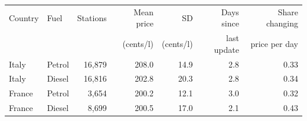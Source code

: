 \begin{tabular}{llrrrrr}
\toprule
Country & Fuel & Stations & Mean price & SD & Days since & Share changing \\
 & & & (cents/l) & (cents/l) & last update & price per day \\
\midrule
Italy & Petrol &    16,879 &  208.0 &  14.9 &   2.8 &  0.33 \\
Italy & Diesel &    16,816 &  202.8 &  20.3 &   2.8 &  0.34 \\
France & Petrol &     3,654 &  200.2 &  12.1 &   3.0 &  0.32 \\
France & Diesel &     8,699 &  200.5 &  17.0 &   2.1 &  0.43 \\
\bottomrule
\end{tabular}
